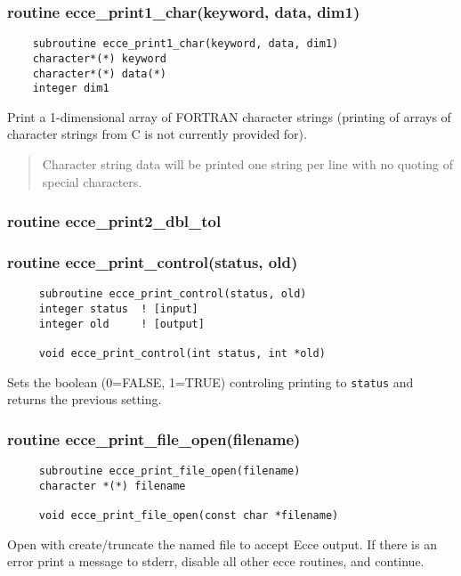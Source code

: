 \subsubsection{ routine ecce\_print1\_char(keyword, data, dim1) }

\begin{verbatim}
    subroutine ecce_print1_char(keyword, data, dim1)
    character*(*) keyword
    character*(*) data(*)
    integer dim1
\end{verbatim}

Print a 1-dimensional array of FORTRAN character strings (printing of
arrays of character strings from C is not currently provided for).

\begin{quotation}

      Character string data will be printed one string per line
      with no quoting of special characters.

\end{quotation}

\subsubsection{ routine ecce\_print2\_dbl\_tol }

\subsubsection{routine ecce\_print\_control(status, old)}

\begin{verbatim}
     subroutine ecce_print_control(status, old)
     integer status  ! [input]
     integer old     ! [output]

     void ecce_print_control(int status, int *old)
\end{verbatim}

Sets the boolean (0=FALSE, 1=TRUE) controling printing to \texttt{status} and
returns the previous setting.

\subsubsection{  routine ecce\_print\_file\_open(filename)}

\begin{verbatim}
     subroutine ecce_print_file_open(filename)
     character *(*) filename

     void ecce_print_file_open(const char *filename)
\end{verbatim}
    Open with create/truncate the named file to accept Ecce output.
    If there is an error print a message to stderr, disable all
    other ecce routines, and continue. 

